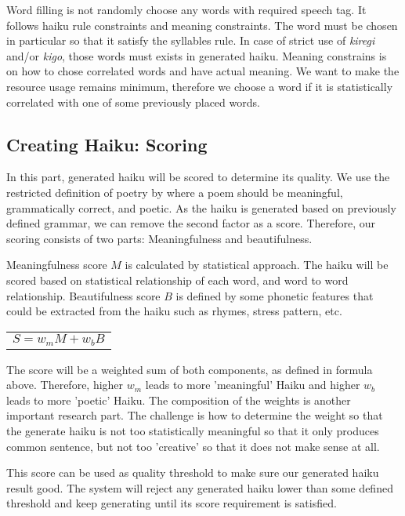 Word filling is not randomly choose any words with required speech tag. It follows haiku rule constraints and meaning constraints. The word must be chosen in particular so that it satisfy the syllables rule. In case of strict use of \textit{kiregi} and/or \textit{kigo}, those words must exists in generated haiku. Meaning constrains is on how to chose correlated words and have actual meaning. We want to make the resource usage remains minimum, therefore we choose a word if it is statistically correlated with one of some previously placed words.


\subsection{Creating Haiku: Scoring}

In this part, generated haiku will be scored to determine its quality. We use the restricted definition of poetry by \citeauthor{manurung2004evolutionary} where a poem should be meaningful, grammatically correct, and poetic. As the haiku is generated based on previously defined grammar, we can remove the second factor as a score. Therefore, our scoring consists of two parts: Meaningfulness and beautifulness. 

Meaningfulness score $M$ is calculated by statistical approach. The haiku will be scored based on statistical relationship of each word, and word to word relationship. Beautifulness score $B$ is defined by some phonetic features that could be extracted from the haiku such as rhymes, stress pattern, etc.

\begin{table}[h]
	\centering
	\begin{tabular}{c}

		$S = w_mM + w_bB$
		\\
	\end{tabular} 
	
\end{table}


The score will be a weighted sum of both components, as defined in formula above. Therefore, higher $w_m$ leads to more 'meaningful' Haiku and higher $w_b$ leads to more 'poetic' Haiku. The composition of the weights is another important research part. The challenge is how to determine the weight so that the generate haiku is not too statistically meaningful so that it only produces common sentence, but not too 'creative' so that it does not make sense at all. 

This score can be used as quality threshold to make sure our generated haiku result good. The system will reject any generated haiku lower than some defined threshold and keep generating until its score requirement is satisfied.